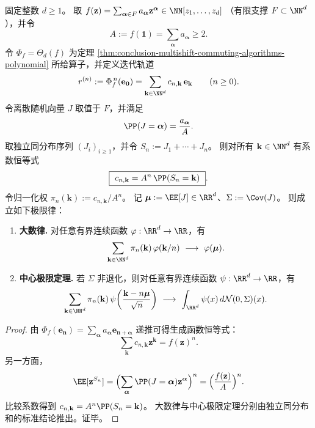\begin{theorem}\label{thm:conclusion-multishift-random-walk-profile}
固定整数 \(d\ge 1\)。
取
\(
f(\mathbf z)=\sum_{\boldsymbol\alpha\in F}a_{\boldsymbol\alpha}\mathbf z^{\boldsymbol\alpha}\in\NN[z_1,\dots,z_d]
\)
（有限支撑 \(F\subset\NN^d\)），并令
\[
A:=f(\mathbf 1)=\sum_{\boldsymbol\alpha}a_{\boldsymbol\alpha}\ge 2.
\]
令 \(\Phi_f=\Theta_d(f)\) 为定理 \ref{thm:conclusion-multishift-commuting-algorithms-polynomial} 所给算子，并定义迭代轨道
\[
r^{(n)}:=\Phi_f^{\,n}(\mathbf e_{\mathbf 0})
=\sum_{\mathbf k\in\NN^d}c_{n,\mathbf k}\,\mathbf e_{\mathbf k}
\qquad(n\ge 0).
\]
令离散随机向量 \(J\) 取值于 \(F\)，并满足
\[
\PP(J=\boldsymbol\alpha)=\frac{a_{\boldsymbol\alpha}}{A}.
\]
取独立同分布序列 \((J_i)_{i\ge 1}\)，并令 \(S_n:=J_1+\cdots+J_n\)。
则对所有 \(\mathbf k\in\NN^d\) 有系数恒等式
\[
\boxed{\ c_{n,\mathbf k}=A^n\,\PP(S_n=\mathbf k)\ }.
\]
令归一化权 \(\pi_n(\mathbf k):=c_{n,\mathbf k}/A^n\)。
记 \(\boldsymbol\mu:=\EE[J]\in\RR^d\)、\(\Sigma:=\Cov(J)\)。
则成立如下极限律：
\begin{enumerate}
  \item \textbf{大数律.}
        对任意有界连续函数 \(\varphi:\RR^d\to\RR\)，有
        \[
        \sum_{\mathbf k\in\NN^d}\pi_n(\mathbf k)\,\varphi(\mathbf k/n)\ \longrightarrow\ \varphi(\boldsymbol\mu).
        \]
  \item \textbf{中心极限定理.}
        若 \(\Sigma\) 非退化，则对任意有界连续函数 \(\psi:\RR^d\to\RR\)，有
        \[
        \sum_{\mathbf k\in\NN^d}\pi_n(\mathbf k)\,
        \psi\!\left(\frac{\mathbf k-n\boldsymbol\mu}{\sqrt n}\right)
        \ \longrightarrow\
        \int_{\RR^d}\psi(x)\,d\mathcal N(0,\Sigma)(x).
        \]
\end{enumerate}
\end{theorem}
\begin{proof}
由 \(\Phi_f(\mathbf e_{\mathbf n})=\sum_{\boldsymbol\alpha}a_{\boldsymbol\alpha}\mathbf e_{\mathbf n+\boldsymbol\alpha}\) 递推可得生成函数恒等式：
\[
\sum_{\mathbf k}c_{n,\mathbf k}\mathbf z^{\mathbf k}=f(\mathbf z)^n.
\]
另一方面，
\[
\EE[\mathbf z^{S_n}]
=\Bigl(\sum_{\boldsymbol\alpha}\PP(J=\boldsymbol\alpha)\mathbf z^{\boldsymbol\alpha}\Bigr)^n
=\Bigl(\frac{f(\mathbf z)}{A}\Bigr)^n.
\]
比较系数得到 \(c_{n,\mathbf k}=A^n\PP(S_n=\mathbf k)\)。
大数律与中心极限定理分别由独立同分布和的标准结论推出。证毕。
\end{proof}

\endinput
